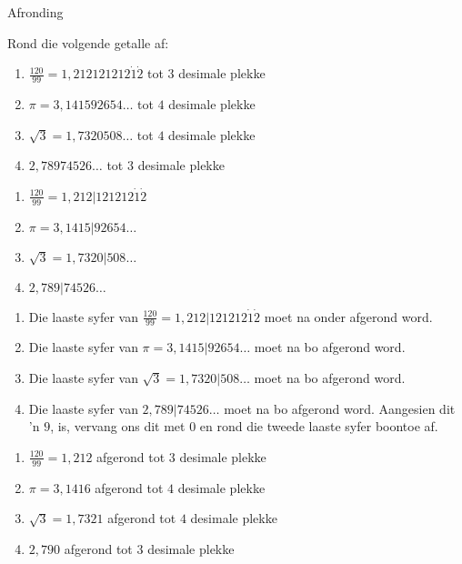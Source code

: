 \begin{wex}{Afronding}

{
\begin{minipage}{\textwidth}
Rond die volgende getalle af: 

\begin{enumerate}[itemsep=5pt, label=\textbf{\arabic*}. ] 

\item $\frac{120}{99}=1,212121212\dot{1}\dot{2}$ tot $3$ desimale plekke
\item $\pi =3,141592654\ldots$ tot $4$ desimale plekke
\item $\sqrt{3}=1,7320508\ldots$ tot $4$ desimale plekke
\item $2,78974526\ldots$ tot $3$ desimale plekke
\end{enumerate}
\end{minipage}
}
{
\begin{minipage}{\textwidth}

\begin{enumerate}[itemsep=5pt, label=\textbf{\arabic*}. ] 
\item $\frac{120}{99}=1,212|121212\dot{1}\dot{2}$
\item $\pi =3,1415|92654\ldots$
\item $\sqrt{3}=1,7320|508\ldots$
\item $2,789|74526\ldots$
\end{enumerate}

\begin{enumerate}[itemsep=5pt, label=\textbf{\arabic*}. ]
\item Die laaste syfer van $\frac{120}{99}=1,212|121212\dot{1}\dot{2}$  moet na onder afgerond word.
\item Die laaste syfer van $\pi =3,1415|92654\ldots$ moet na bo afgerond word.
\item Die laaste syfer van $\sqrt{3}=1,7320|508\ldots$ moet na bo afgerond word.
\item Die laaste syfer van $2,789|74526\ldots$ moet na bo afgerond word.  
\newline Aangesien dit ’n $9$, is, vervang ons dit met $0$ en
rond die tweede laaste syfer boontoe af.
\end{enumerate}

\begin{enumerate}[itemsep=5pt, label=\textbf{\arabic*}. ]
\item $\frac{120}{99}=1,212$ afgerond tot $3$ desimale plekke
\item $\pi =3,1416$  afgerond tot $4$ desimale plekke
\item $\sqrt{3}=1,7321$ afgerond tot $4$ desimale plekke
\item $2,790$ afgerond tot $3$ desimale plekke
\end{enumerate}
\end{minipage}
}  
\end{wex}


